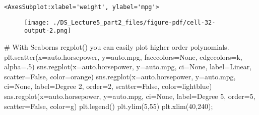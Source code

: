 \documentclass[
  letterpaper,
  DIV=11,
  numbers=noendperiod]{scrreprt}
\newenvironment{Shaded}{\begin{snugshade}}{\end{snugshade}}
\newcommand{\CommentTok}[1]{\textcolor[rgb]{0.37,0.37,0.37}{#1}}
\newcommand{\DecValTok}[1]{\textcolor[rgb]{0.68,0.00,0.00}{#1}}
\newcommand{\FloatTok}[1]{\textcolor[rgb]{0.68,0.00,0.00}{#1}}
\newcommand{\NormalTok}[1]{\textcolor[rgb]{0.00,0.23,0.31}{#1}}
\newcommand{\OperatorTok}[1]{\textcolor[rgb]{0.37,0.37,0.37}{#1}}
\newcommand{\StringTok}[1]{\textcolor[rgb]{0.13,0.47,0.30}{#1}}
\newcommand{\VariableTok}[1]{\textcolor[rgb]{0.07,0.07,0.07}{#1}}
\begin{document}
\begin{verbatim}
<AxesSubplot:xlabel='weight', ylabel='mpg'>
\end{verbatim}

\begin{figure}[H]

{\centering \texttt{[image: ./DS\_Lecture5\_part2\_files/figure-pdf/cell-32-output-2.png]}

}

\end{figure}

\begin{Shaded}
\begin{Highlighting}[]
\CommentTok{\# With Seaborn\textquotesingle{}s regplot() you can easily plot higher order polynomials.}
\NormalTok{plt.scatter(x}\OperatorTok{=}\NormalTok{auto.horsepower, y}\OperatorTok{=}\NormalTok{auto.mpg, facecolors}\OperatorTok{=}\StringTok{\textquotesingle{}None\textquotesingle{}}\NormalTok{, edgecolors}\OperatorTok{=}\StringTok{\textquotesingle{}k\textquotesingle{}}\NormalTok{, alpha}\OperatorTok{=}\FloatTok{.5}\NormalTok{) }
\NormalTok{sns.regplot(x}\OperatorTok{=}\NormalTok{auto.horsepower, y}\OperatorTok{=}\NormalTok{auto.mpg, ci}\OperatorTok{=}\VariableTok{None}\NormalTok{, label}\OperatorTok{=}\StringTok{\textquotesingle{}Linear\textquotesingle{}}\NormalTok{, scatter}\OperatorTok{=}\VariableTok{False}\NormalTok{, color}\OperatorTok{=}\StringTok{\textquotesingle{}orange\textquotesingle{}}\NormalTok{)}
\NormalTok{sns.regplot(x}\OperatorTok{=}\NormalTok{auto.horsepower, y}\OperatorTok{=}\NormalTok{auto.mpg, ci}\OperatorTok{=}\VariableTok{None}\NormalTok{, label}\OperatorTok{=}\StringTok{\textquotesingle{}Degree 2\textquotesingle{}}\NormalTok{, order}\OperatorTok{=}\DecValTok{2}\NormalTok{, scatter}\OperatorTok{=}\VariableTok{False}\NormalTok{, color}\OperatorTok{=}\StringTok{\textquotesingle{}lightblue\textquotesingle{}}\NormalTok{)}
\NormalTok{sns.regplot(x}\OperatorTok{=}\NormalTok{auto.horsepower, y}\OperatorTok{=}\NormalTok{auto.mpg, ci}\OperatorTok{=}\VariableTok{None}\NormalTok{, label}\OperatorTok{=}\StringTok{\textquotesingle{}Degree 5\textquotesingle{}}\NormalTok{, order}\OperatorTok{=}\DecValTok{5}\NormalTok{, scatter}\OperatorTok{=}\VariableTok{False}\NormalTok{, color}\OperatorTok{=}\StringTok{\textquotesingle{}g\textquotesingle{}}\NormalTok{)}
\NormalTok{plt.legend()}
\NormalTok{plt.ylim(}\DecValTok{5}\NormalTok{,}\DecValTok{55}\NormalTok{)}
\NormalTok{plt.xlim(}\DecValTok{40}\NormalTok{,}\DecValTok{240}\NormalTok{)}\OperatorTok{;}
\end{Highlighting}
\end{Shaded}
\end{document}
